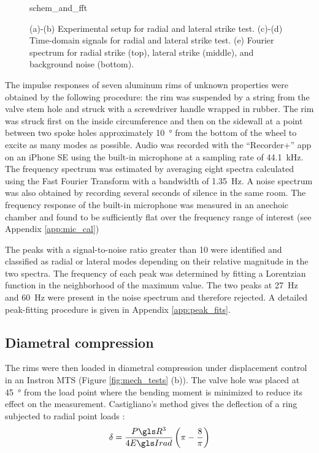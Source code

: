 \documentclass[../thesis.tex]{subfiles}
\begin{document}
\begin{figure}
\centering
{schem_and_fft}
\caption{(a)-(b) Experimental setup for radial and lateral strike test. (c)-(d) Time-domain signals for radial and lateral strike test. (e) Fourier spectrum for radial strike (top), lateral strike (middle), and background noise (bottom).}
\label{fig:schem}
\end{figure}

The impulse responses of seven aluminum rims of unknown properties were obtained by the following procedure: the rim was suspended by a string from the valve stem hole and struck with a screwdriver handle wrapped in rubber. The rim was struck first on the inside circumference and then on the sidewall at a point between two spoke holes approximately \SI{10}{\degree} from the bottom of the wheel to excite as many modes as possible. Audio was recorded with the ``Recorder+'' app on an iPhone SE using the built-in microphone at a sampling rate of \SI{44.1}{kHz}. The frequency spectrum was estimated by averaging eight spectra calculated using the Fast Fourier Transform with a bandwidth of \SI{1.35}{Hz}. A noise spectrum was also obtained by recording several seconds of silence in the same room. The frequency response of the built-in microphone was measured in an anechoic chamber and found to be sufficiently flat over the frequency range of interest (see Appendix \ref{app:mic_cal})

The peaks with a signal-to-noise ratio greater than 10 were identified and classified as radial or lateral modes depending on their relative magnitude in the two spectra. The frequency of each peak was determined by fitting a Lorentzian function in the neighborhood of the maximum value. The two peaks at \SI{27}{Hz} and \SI{60}{Hz} were present in the noise spectrum and therefore rejected. A detailed peak-fitting procedure is given in Appendix \ref{app:peak_fits}.

\subsection{Diametral compression}
The rims were then loaded in diametral compression under displacement control in an Instron MTS (Figure \ref{fig:mech_tests} (b)). The valve hole was placed at \SI{45}{\degree} from the load point where the bending moment is minimized to reduce its effect on the measurement. Castigliano's method gives the deflection of a ring subjected to radial point loads \cite{Timoshenko1961}:
  \begin{equation}\label{eq:def_rad}
  \delta = \frac{P\R^3}{4\EIr} \left(\pi-\frac{8}{\pi} \right)
  \end{equation}
\end{document}
